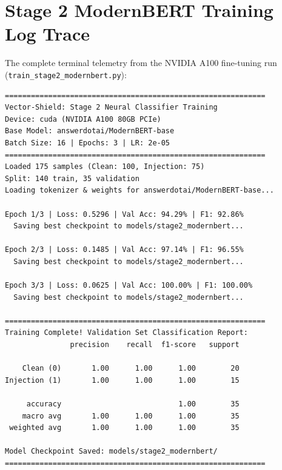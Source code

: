 \section{Stage 2 ModernBERT Training Log Trace}
The complete terminal telemetry from the NVIDIA A100 fine-tuning run (\texttt{train\_stage2\_modernbert.py}):

\begin{footnotesize}
\begin{verbatim}
============================================================
Vector-Shield: Stage 2 Neural Classifier Training
Device: cuda (NVIDIA A100 80GB PCIe)
Base Model: answerdotai/ModernBERT-base
Batch Size: 16 | Epochs: 3 | LR: 2e-05
============================================================
Loaded 175 samples (Clean: 100, Injection: 75)
Split: 140 train, 35 validation
Loading tokenizer & weights for answerdotai/ModernBERT-base...

Epoch 1/3 | Loss: 0.5296 | Val Acc: 94.29% | F1: 92.86%
  Saving best checkpoint to models/stage2_modernbert...

Epoch 2/3 | Loss: 0.1485 | Val Acc: 97.14% | F1: 96.55%
  Saving best checkpoint to models/stage2_modernbert...

Epoch 3/3 | Loss: 0.0625 | Val Acc: 100.00% | F1: 100.00%
  Saving best checkpoint to models/stage2_modernbert...

============================================================
Training Complete! Validation Set Classification Report:
               precision    recall  f1-score   support

    Clean (0)       1.00      1.00      1.00        20
Injection (1)       1.00      1.00      1.00        15

     accuracy                           1.00        35
    macro avg       1.00      1.00      1.00        35
 weighted avg       1.00      1.00      1.00        35

Model Checkpoint Saved: models/stage2_modernbert/
============================================================
\end{verbatim}
\end{footnotesize}
